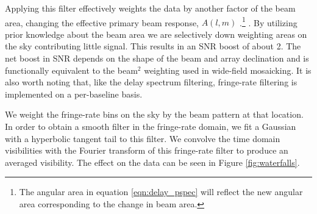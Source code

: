 \documentclass[twocolumn,numberedappendix]{emulateapj} \shorttitle{PSA64}
\begin{document}
Applying this filter effectively weights the data by another factor of the beam
area, changing the effective primary beam response, $A(l,m)$ .\footnote{The
angular area in equation \ref{eqn:delay_pspec} will reflect the new angular area
corresponding to the change in beam area.} \citep{parsons_et_al2015}. By
utilizing prior knowledge about the beam area we are selectively down weighting
areas on the sky contributing little signal. This results in an SNR boost of
about 2.  The net boost in SNR depends on the shape of the beam and array
declination and is functionally equivalent to the beam$^2$ weighting used in
wide-field mosaicking. It is also worth noting that, like the delay spectrum
filtering, fringe-rate filtering is implemented on a per-baseline basis.

 We weight
the fringe-rate bins on the sky by the beam pattern at that location.
In order to obtain a smooth filter in the fringe-rate domain, we fit a
Gaussian with a hyperbolic tangent tail to this filter. We convolve the time
domain visibilities with the Fourier transform of this fringe-rate filter to
produce an averaged visibility.  The effect on the data can be seen
in Figure \ref{fig:waterfalls}.

\end{document}
